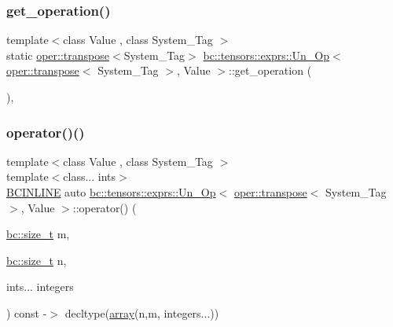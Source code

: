 \subsubsection{\texorpdfstring{get\+\_\+operation()}{get\_operation()}}
{\footnotesize\ttfamily template$<$class Value , class System\+\_\+\+Tag $>$ \\
static \hyperlink{structbc_1_1oper_1_1transpose}{oper\+::transpose}$<$System\+\_\+\+Tag$>$ \hyperlink{structbc_1_1tensors_1_1exprs_1_1Un__Op}{bc\+::tensors\+::exprs\+::\+Un\+\_\+\+Op}$<$ \hyperlink{structbc_1_1oper_1_1transpose}{oper\+::transpose}$<$ System\+\_\+\+Tag $>$, Value $>$\+::get\+\_\+operation (\begin{DoxyParamCaption}{ }\end{DoxyParamCaption})\hspace{0.3cm}{\ttfamily [inline]}, {\ttfamily [static]}}

\mbox{\label{structbc_1_1tensors_1_1exprs_1_1Un__Op_3_01oper_1_1transpose_3_01System__Tag_01_4_00_01Value_01_4_a8ea2ec54a5619d9180e338e31d97562a}} 
\subsubsection{\texorpdfstring{operator()()}{operator()()}\hspace{0.1cm}{\footnotesize\ttfamily [1/2]}}
{\footnotesize\ttfamily template$<$class Value , class System\+\_\+\+Tag $>$ \\
template$<$class... ints$>$ \\
\hyperlink{common_8h_a6699e8b0449da5c0fafb878e59c1d4b1}{B\+C\+I\+N\+L\+I\+NE} auto \hyperlink{structbc_1_1tensors_1_1exprs_1_1Un__Op}{bc\+::tensors\+::exprs\+::\+Un\+\_\+\+Op}$<$ \hyperlink{structbc_1_1oper_1_1transpose}{oper\+::transpose}$<$ System\+\_\+\+Tag $>$, Value $>$\+::operator() (\begin{DoxyParamCaption}\item[{\hyperlink{namespacebc_aaf8e3fbf99b04b1b57c4f80c6f55d3c5}{bc\+::size\+\_\+t}}]{m,  }\item[{\hyperlink{namespacebc_aaf8e3fbf99b04b1b57c4f80c6f55d3c5}{bc\+::size\+\_\+t}}]{n,  }\item[{ints...}]{integers }\end{DoxyParamCaption}) const -\/$>$ decltype(\hyperlink{structbc_1_1tensors_1_1exprs_1_1Un__Op_3_01oper_1_1transpose_3_01System__Tag_01_4_00_01Value_01_4_a0860f3671495a9b2826a4352e810dd97}{array}(n,m, integers...)) \hspace{0.3cm}{\ttfamily [inline]}}

